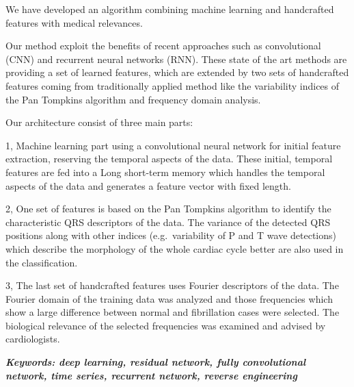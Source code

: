 We have developed an algorithm combining machine learning and handcrafted
features with medical relevances.

Our method exploit the benefits of recent approaches such as convolutional (CNN) and recurrent neural networks (RNN).
These state of the art methods are providing a set of learned features, which are extended by two sets of handcrafted features coming from traditionally applied method like the variability indices of the Pan Tompkins algorithm and frequency domain analysis.



Our architecture consist of three main parts:

1, Machine learning part using a
convolutional neural network for initial feature extraction, reserving the
temporal aspects of the data. These initial, temporal features are fed into a
Long short-term memory which handles the temporal aspects of the data and
generates a feature vector with fixed length.

2, One set of features is based on the Pan Tompkins algorithm to identify the
characteristic QRS descriptors of the data. The variance of the detected QRS
positions along with other indices (e.g.\ variability of P and T wave
detections) which describe the morphology of the whole cardiac cycle better are
also used in the classification.

3, The last set of handcrafted features uses Fourier descriptors of the data.
The Fourier domain of the training data was analyzed and those frequencies which
show a large difference between normal and fibrillation cases were selected. The
biological relevance of the selected frequencies was examined and advised by
cardiologists.
%

\textit{\textbf{Keywords: deep learning, residual network, fully convolutional network, time series, recurrent network, reverse engineering}}
